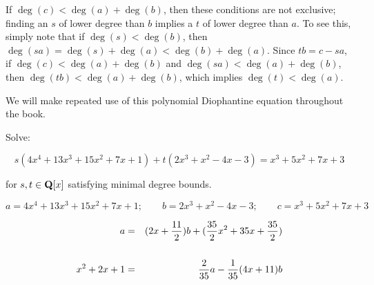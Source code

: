 If $\deg(c)<\deg(a)+\deg(b)$, then these conditions are not exclusive;
finding an $s$ of lower degree than $b$ implies a $t$ of lower degree
than $a$.  To see this, simply note that if $\deg(s)<\deg(b)$, then
$\deg(sa)=\deg(s)+\deg(a)<\deg(b)+\deg(a)$.  Since $tb=c-sa$, if
$\deg(c)<\deg(a)+\deg(b)$ and $\deg(sa)<\deg(a)+\deg(b)$, then
$\deg(tb)<\deg(a)+\deg(b)$, which implies $\deg(t)<\deg(a)$.

We will make repeated use of this polynomial Diophantine equation
throughout the book.

\vfill\eject

\example

Solve:

$$s(4x^4+13x^3+15x^2+7x+1) + t(2x^3+x^2-4x-3) = x^3 + 5x^2 + 7x +3$$

\quad for $s,t \in {\bf Q}[x]$ satisfying minimal degree bounds.

\bigskip




$$a = 4x^4+13x^3+15x^2+7x+1; \qquad
b = 2x^3+x^2-4x-3; \qquad
c = x^3 + 5x^2 + 7x +3$$


\begin{eqnarray*}
a &=& (2x+{11\over2})b + ({35\over2}x^2+35x+{35\over2})
 \cr\cr
x^2+2x+1 &=& {2\over35}a - {1\over35}(4x+11)b \cr
\end{eqnarray*}






